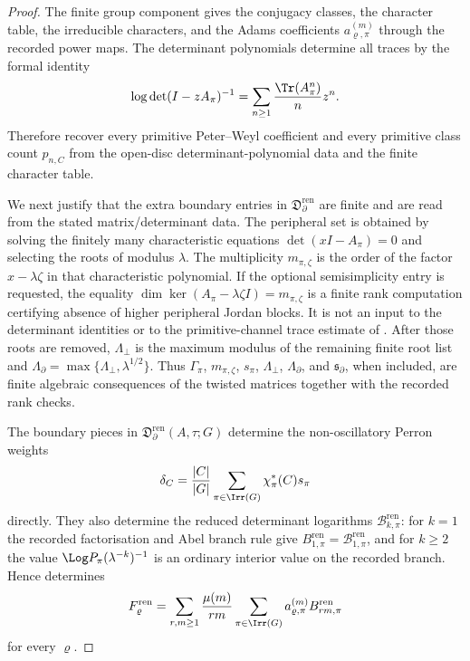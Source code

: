 \begin{proof}
  The finite group component gives the conjugacy classes, the character
  table, the irreducible characters, and the Adams coefficients
  \(a_{\varrho,\pi}^{(m)}\) through the recorded power maps.  The determinant
  polynomials determine all traces by the formal identity
  \[
    \log\det(I-zA_\pi)^{-1}
    =
    \sum_{n\ge1}\frac{\Tr(A_\pi^n)}{n}z^n .
  \]
  Therefore
  recover every primitive Peter--Weyl coefficient and every primitive class
  count \(p_{n,C}\) from the open-disc determinant-polynomial data and the
  finite character table.

  We next justify that the extra boundary entries in
  \(\mathfrak D_{\partial}^{\mathrm{ren}}\) are finite and are read from
  the stated matrix/determinant data.  The peripheral set is obtained by
  solving the finitely many characteristic equations
  \(\det(xI-A_\pi)=0\) and selecting the roots of modulus \(\lambda\).
  The multiplicity \(m_{\pi,\zeta}\) is the order of the factor
  \(x-\lambda\zeta\) in that characteristic polynomial.  If the optional
  semisimplicity entry is requested, the equality
  \(\dim\ker(A_\pi-\lambda\zeta I)=m_{\pi,\zeta}\) is a finite rank
  computation certifying absence of higher peripheral Jordan blocks.  It is
  not an input to the determinant identities or to the primitive-channel
  trace estimate of .  After
  those roots are removed, \(\Lambda_\perp\) is the maximum modulus of the
  remaining finite root list and
  \(\Lambda_\partial=\max\{\Lambda_\perp,\lambda^{1/2}\}\).  Thus
  \(\Gamma_\pi\), \(m_{\pi,\zeta}\), \(s_\pi\),
  \(\Lambda_\perp\), \(\Lambda_\partial\), and
  \(\mathfrak s_\partial\), when included, are finite algebraic consequences
  of the twisted matrices together with the recorded rank checks.

  The boundary pieces in
  \(\mathfrak D_{\partial}^{\mathrm{ren}}(A,\tau;G)\) determine the
  non-oscillatory Perron weights
  \[
    \delta_C=
    \frac{|C|}{|G|}
      \sum_{\pi\in\Irr(G)}\chi_\pi^\ast(C)s_\pi
  \]
  directly.  They also determine the reduced determinant logarithms
  \(\mathcal B_{k,\pi}^{\mathrm{ren}}\): for \(k=1\) the recorded
  factorisation and Abel branch rule give
  \(B_{1,\pi}^{\mathrm{ren}}=\mathcal B_{1,\pi}^{\mathrm{ren}}\), and for
  \(k\ge2\) the value
  \(\Log P_\pi(\lambda^{-k})^{-1}\) is an ordinary interior value on the
  recorded branch.  Hence
   determines
  \[
    F_\varrho^{\mathrm{ren}}
    =
    \sum_{r,m\ge1}\frac{\mu(m)}{rm}
      \sum_{\pi\in\Irr(G)}
        a_{\varrho,\pi}^{(m)}
        B_{rm,\pi}^{\mathrm{ren}}
  \]
  for every \(\varrho\).


\end{proof}
